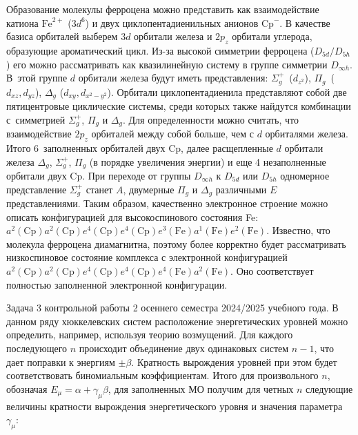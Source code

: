  Образование молекулы ферроцена можно представить как взаимодействие катиона $\text{Fe}^{2+}$ ($3d^6$) и двух циклопентадиенильных анионов $\text{Cp}^-$. В качестве базиса орбиталей выберем $3d$ орбитали железа и $2p_z$ орбитали углерода, образующие ароматический цикл. Из-за высокой симметрии ферроцена ($D_{5d} / D_{5h}$) его можно рассматривать как квазилинейную систему в группе симметрии $D_{\infty h}$. В~этой группе $d$ орбитали железа будут иметь представления: $\Sigma_g^+$~($d_{z^2}$), $\Pi_g$~($d_{xz}, d_{yz}$), $\Delta_g$ ($d_{xy}, d_{x^2-y^2}$). Орбитали циклопентадиенила представляют собой две пятицентровые циклические системы, среди которых также найдутся комбинации с~симметрией $\Sigma_g^+$, $\Pi_g$ и $\Delta_g$. Для определенности можно считать, что взаимодействие $2p_z$ орбиталей между собой больше, чем с $d$ орбиталями железа. Итого 6~заполненных орбиталей двух Cp, далее расщепленные $d$ орбитали железа $\Delta_g$, $\Sigma_g^+$, $\Pi_g$ (в порядке увеличения энергии) и еще 4 незаполненные орбитали двух Cp. При переходе от группы $D_{\infty h}$ к $D_{5d}$ или $D_{5h}$ одномерное представление $\Sigma_g^+$ станет $A$, двумерные $\Pi_g$ и $\Delta_g$ различными $E$ представлениями. Таким образом, качественно электронное строение можно описать конфигурацией для высокоспинового состояния Fe: $a^2(\text{Cp}) a^2(\text{Cp}) e^4(\text{Cp}) e^4(\text{Cp}) e^3(\text{Fe}) a^1(\text{Fe}) e^2(\text{Fe})$. Известно, что молекула ферроцена диамагнитна, поэтому более корректно будет рассматривать низкоспиновое состояние комплекса с электронной конфигурацией $a^2(\text{Cp}) a^2(\text{Cp}) e^4(\text{Cp}) e^4(\text{Cp}) e^4(\text{Fe}) a^2(\text{Fe})$. Оно соответствует полностью заполненной электронной конфигурации.\par
{} Задача 3 контрольной работы 2 осеннего семестра 2024/2025 учебного года. В данном ряду хюккелевских систем расположение энергетических уровней можно определить, например, используя теорию возмущений. Для каждого последующего $n$ происходит объединение двух одинаковых систем $n-1$, что дает поправки к энергиям $\pm \beta$. Кратность вырождения уровней при этом будет соответствовать биномиальным коэффициентам. Итого для произвольного $n$, обозначая $E_{\mu}=\alpha+\gamma_{\mu} \beta$, для заполненных МО получим для четных $n$ следующие величины кратности вырождения энергетического уровня и значения параметра $\gamma_{\mu}$:\par
\vspace{-\parskip}
\vspace{2mm}
\hspace{8mm}
